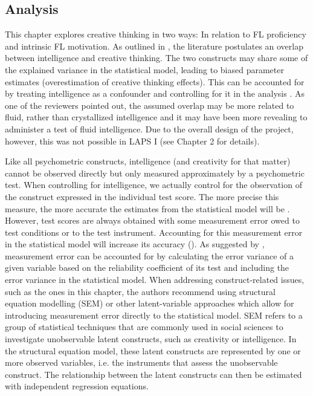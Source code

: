 \documentclass[output=paper]{langsci/langscibook}
\begin{document}
\subsection{Analysis}\label{sec:06:3.3}

This chapter explores creative thinking in two ways: In relation to FL proficiency and intrinsic FL motivation. As outlined in , the literature postulates an overlap between intelligence and creative thinking. The two constructs may share some of the explained variance in the statistical model, leading to biased parameter estimates (overestimation of creative thinking effects). This can be accounted for by treating intelligence as a confounder and controlling for it in the analysis \citep{Rohrer2018}. As one of the reviewers pointed out, the assumed overlap may be more related to fluid, rather than crystallized intelligence and it may have been more revealing to administer a test of fluid intelligence. Due to the overall design of the project, however, this was not possible in LAPS I (see Chapter 2 for details).

Like all psychometric constructs, intelligence (and creativity for that matter) cannot be observed directly but only measured approximately by a psychometric test. When controlling for intelligence, we actually control for the observation of the construct expressed in the individual test score. The more precise this measure, the more accurate the estimates from the statistical model will be \citep{Vanhove2015}. However, test scores are always obtained with some measurement error owed to test conditions or to the test instrument. Accounting for this measurement error in the statistical model will increase its accuracy (\citealt{BrunnerAustin2009}). As suggested by \citet{WestfallYarkoni2016}, measurement error can be accounted for by calculating the error variance of a given variable based on the reliability coefficient of its test and including the error variance in the statistical model. When addressing construct-related issues, such as the ones in this chapter, the authors recommend using structural equation modelling (SEM) or other latent-variable approaches which allow for introducing measurement error directly to the statistical model. SEM refers to a group of statistical techniques that are commonly used in social sciences to investigate unobservable latent constructs, such as creativity or intelligence. In the structural equation model, these latent constructs are represented by one or more observed variables, i.e. the instruments that assess the unobservable construct. The relationship between the latent constructs can then be estimated with independent regression equations. 
\end{document}
